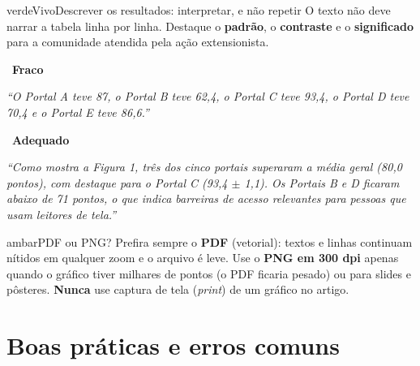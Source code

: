 \documentclass[11pt,a4paper]{article}
\newenvironment{dica}[1]{\begin{destaque}{ambar}{\faLightbulb[regular]}{#1}}{\end{destaque}}
\newenvironment{sucesso}[1]{\begin{destaque}{verdeVivo}{\faCheckCircle[regular]}{#1}}{\end{destaque}}
\begin{document}
\begin{sucesso}{Descrever os resultados: interpretar, e não repetir}
O texto não deve narrar a tabela linha por linha. Destaque o \textbf{padrão}, o \textbf{contraste} e o \textbf{significado} para a comunidade atendida pela ação extensionista.\par\vspace{4pt}
\begin{tcbraster}[raster columns=2, raster equal height, raster column skip=8pt]
\begin{tcolorbox}[enhanced, colback=white, colframe=vermelho!35, boxrule=0.6pt, arc=6pt, fontupper=\small\raggedright]
{\color{vermelho}\faTimesCircle\ \textbf{Fraco}}\par
\textit{``O Portal A teve 87, o Portal B teve 62,4, o Portal C teve 93,4, o Portal D teve 70,4 e o Portal E teve 86,6.''}
\end{tcolorbox}
\begin{tcolorbox}[enhanced, colback=white, colframe=verdeVivo!45, boxrule=0.6pt, arc=6pt, fontupper=\small\raggedright]
{\color{verdeVivo}\faCheckCircle\ \textbf{Adequado}}\par
\textit{``Como mostra a Figura 1, três dos cinco portais superaram a média geral (80,0 pontos), com destaque para o Portal C (93,4 $\pm$ 1,1). Os Portais B e D ficaram abaixo de 71 pontos, o que indica barreiras de acesso relevantes para pessoas que usam leitores de tela.''}
\end{tcolorbox}
\end{tcbraster}
\end{sucesso}

\begin{dica}{PDF ou PNG?}
Prefira sempre o \textbf{PDF} (vetorial): textos e linhas continuam nítidos em qualquer zoom e o arquivo é leve. Use o \textbf{PNG em 300 dpi} apenas quando o gráfico tiver milhares de pontos (o PDF ficaria pesado) ou para slides e pôsteres. \textbf{Nunca} use captura de tela (\textit{print}) de um gráfico no artigo.
\end{dica}

\section{Boas práticas e erros comuns}\label{sec:erros}
\end{document}
